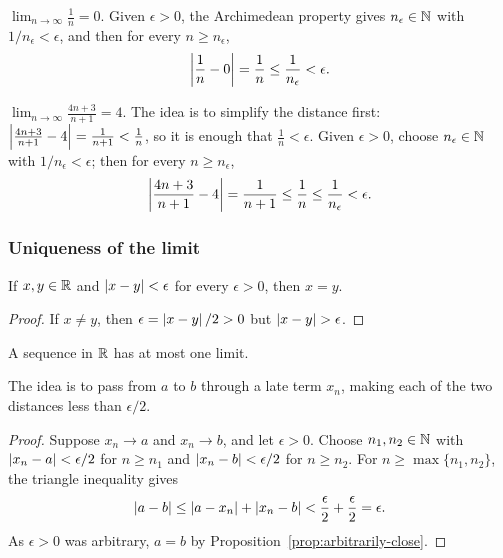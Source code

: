 \begin{eg}
  $\lim_{n \to \infty} \frac{1}{n} = 0$. Given $\epsilon > 0$, the
  Archimedean property gives $n_\epsilon \in \mathbb{N}$ with
  $1/n_\epsilon < \epsilon$, and then for every $n \geq n_\epsilon$,
  \[
    \left\lvert \frac{1}{n} - 0\right\rvert = \frac{1}{n} \leq \frac{1}{n_\epsilon} < \epsilon.
  \]
\end{eg}

\begin{eg}
  $\lim_{n \to \infty} \frac{4n + 3}{n + 1} = 4$. The idea is to simplify
  the distance first:
  $\left\lvert \frac{4n + 3}{n + 1} - 4\right\rvert = \frac{1}{n + 1} < \frac{1}{n}$, so it is
  enough that $\frac{1}{n} < \epsilon$. Given $\epsilon > 0$, choose
  $n_\epsilon \in \mathbb{N}$ with $1/n_\epsilon < \epsilon$; then for every
  $n \geq n_\epsilon$,
  \[
    \left\lvert \frac{4n + 3}{n + 1} - 4\right\rvert = \frac{1}{n + 1} \leq \frac{1}{n} \leq \frac{1}{n_\epsilon} < \epsilon.
  \]
\end{eg}

\subsubsection*{Uniqueness of the limit}
\begin{nprop}\label{prop:arbitrarily-close}
  If $x, y \in \mathbb{R}$ and $\left\lvert x - y\right\rvert < \epsilon$ for every $\epsilon > 0$,
  then $x = y$.
\end{nprop}

\begin{proof}
  If $x \neq y$, then $\epsilon = \left\lvert x - y\right\rvert/2 > 0$ but
  $\left\lvert x - y\right\rvert > \epsilon$.
\end{proof}

\begin{nthm}\label{thm:limit-unique}
  A sequence in $\mathbb{R}$ has at most one limit.
\end{nthm}
The idea is to pass from $a$ to $b$ through a late term $x_n$, making each
of the two distances less than $\epsilon/2$.

\begin{proof}
  Suppose $x_n \to a$ and $x_n \to b$, and let $\epsilon > 0$. Choose
  $n_1, n_2 \in \mathbb{N}$ with $\left\lvert x_n - a\right\rvert < \epsilon/2$ for $n \geq n_1$ and
  $\left\lvert x_n - b\right\rvert < \epsilon/2$ for $n \geq n_2$. For
  $n \geq \max\{n_1, n_2\}$, the triangle inequality gives
  \[
    \left\lvert a - b\right\rvert \leq \left\lvert a - x_n\right\rvert + \left\lvert x_n - b\right\rvert < \frac{\epsilon}{2} + \frac{\epsilon}{2} = \epsilon.
  \]
  As $\epsilon > 0$ was arbitrary, $a = b$ by
  Proposition~\ref{prop:arbitrarily-close}.
\end{proof}

